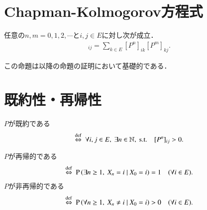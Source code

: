 \section{Chapman-Kolmogorov方程式}
	\begin{prp}
		任意の$n,m = 0,1,2,\cdots$と$i,j \in E$に対し次が成立．
		\begin{align}
			[P^{n+m}]_{ij} = \sum_{k \in E}[P^n]_{ik}[P^m]_{kj}. 
		\end{align}
	\end{prp}
	
	この命題は以降の命題の証明において基礎的である．

\section{既約性・再帰性}
	\begin{dfn}[既約性]
		$P$が既約である
		\begin{align}
			\overset{\mathrm{def}}{\Leftrightarrow}\ \forall i, j \in E,\ \exists n \in \mathbb{N},\ \mathrm{s.t. \quad} [P^n]_{ij} > 0.
		\end{align}
	\end{dfn}
	\begin{dfn}[再帰性]
		$P$が再帰的である
		\begin{align}
			\overset{\mathrm{def}}{\Leftrightarrow}\ \operatorname{P} \left( \exists n \geq 1,\ X_n = i \ \middle|\ X_0 = i \right) = 1 \quad(\forall i \in E).
		\end{align}
		$P$が非再帰的である
		\begin{align}
			\overset{\mathrm{def}}{\Leftrightarrow}\ \operatorname{P} \left( \forall n \geq 1,\ X_n \neq i \ \middle|\ X_0 = i \right) > 0 \quad(\forall i \in E).
		\end{align}
	\end{dfn}
	
